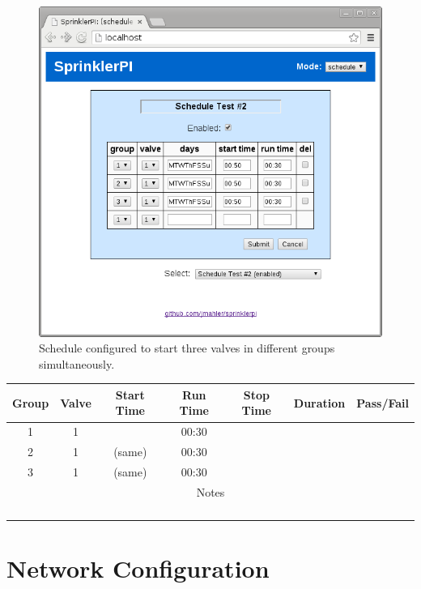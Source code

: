 \documentclass{article}
\begin{document}
\begin{enumerate}
	\begin{figure}[hbp!]
	\begin{center}
	\includegraphics[scale=0.5]{img/www-schedule_test2}
	\end{center}
	\caption{Schedule configured to start three valves in different groups
		simultaneously.}
	\label{fig:www-schedule_test2}
	\end{figure}

	\vspace{1em}
	\begin{center}
	\begin{tabular}{|c|c|c|c|c|c|c|}
		\hline
		Group & Valve & Start Time & Run Time & Stop Time & Duration & Pass/Fail \\
		\hline
		1 & 1 & & 00:30 & & & \hspace{4em} \\
		\hline
		2 & 1 & (same) & 00:30 & & & \\
		\hline
		3 & 1 & (same) & 00:30 & & & \\
		\hline
		\hline
		\multicolumn{7}{|c|}{Notes} \\
		\multicolumn{7}{|c|}{} \\
		\multicolumn{7}{|c|}{} \\
		\multicolumn{7}{|c|}{} \\
		\multicolumn{7}{|c|}{} \\
		\hline
	\end{tabular}
	\end{center}

\end{enumerate}

\FloatBarrier


\clearpage
\appendix

\section{Network Configuration}
\label{app:networking}


\end{document}

